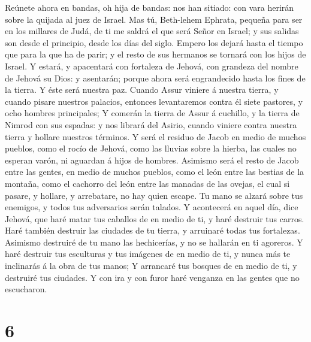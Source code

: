  Reúnete ahora en bandas, oh hija de bandas: nos han
sitiado: con vara herirán sobre la quijada al juez de Israel.
 Mas tú, Beth-lehem Ephrata, pequeña para ser en los
millares de Judá, de ti me saldrá el que será Señor en Israel; y sus
salidas son desde el principio, desde los días del siglo. 
Empero los dejará hasta el tiempo que para la que ha de parir; y el
resto de sus hermanos se tornará con los hijos de Israel.  Y
estará, y apacentará con fortaleza de Jehová, con grandeza del nombre de
Jehová su Dios: y asentarán; porque ahora será engrandecido hasta los
fines de la tierra.  Y éste será nuestra paz. Cuando Assur
viniere á nuestra tierra, y cuando pisare nuestros palacios, entonces
levantaremos contra él siete pastores, y ocho hombres principales;
 Y comerán la tierra de Assur á cuchillo, y la tierra de
Nimrod con sus espadas: y nos librará del Asirio, cuando viniere contra
nuestra tierra y hollare nuestros términos.  Y será el
residuo de Jacob en medio de muchos pueblos, como el rocío de Jehová,
como las lluvias sobre la hierba, las cuales no esperan varón, ni
aguardan á hijos de hombres.  Asimismo será el resto de
Jacob entre las gentes, en medio de muchos pueblos, como el león entre
las bestias de la montaña, como el cachorro del león entre las manadas
de las ovejas, el cual si pasare, y hollare, y arrebatare, no hay quien
escape.  Tu mano se alzará sobre tus enemigos, y todos tus
adversarios serán talados.  Y acontecerá en aquel día, dice
Jehová, que haré matar tus caballos de en medio de ti, y haré destruir
tus carros.  Haré también destruir las ciudades de tu
tierra, y arruinaré todas tus fortalezas.  Asimismo
destruiré de tu mano las hechicerías, y no se hallarán en ti agoreros.
 Y haré destruir tus esculturas y tus imágenes de en medio
de ti, y nunca más te inclinarás á la obra de tus manos;  Y
arrancaré tus bosques de en medio de ti, y destruiré tus ciudades.
 Y con ira y con furor haré venganza en las gentes que no
escucharon.

\hypertarget{section-5}{%
\section{6}\label{section-5}}

